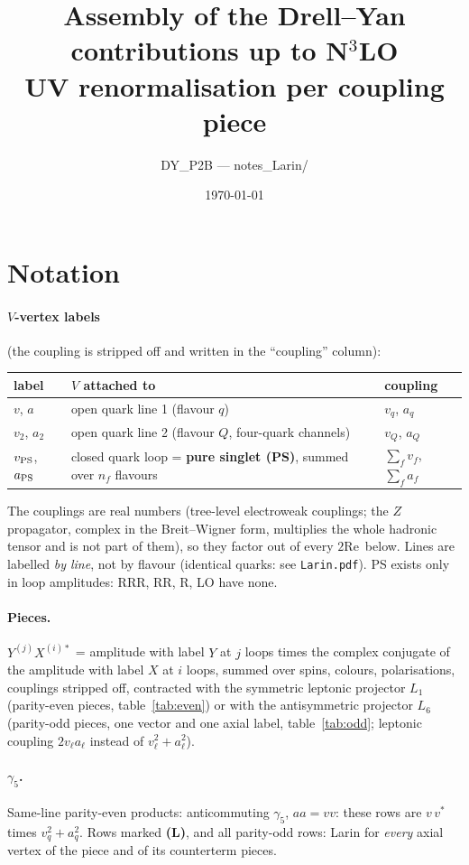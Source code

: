 \documentclass[11pt,a4paper]{article}
\title{Assembly of the Drell--Yan contributions up to N$^3$LO\\[2pt]\large UV renormalisation per coupling piece}
\author{DY\_P2B --- notes\_Larin/}
\date{\today}
\renewcommand{\Re}{\mathrm{Re}\,}
\newcommand{\PS}{_{\rm PS}}
\begin{document}
\maketitle

\section{Notation}

\paragraph{$V$-vertex labels} (the coupling is stripped off and written in the ``coupling'' column):
\begin{center}
\begin{tabular}{lll}
\toprule
label & $V$ attached to & coupling \\
\midrule
$v$, $a$ & open quark line 1 (flavour $q$) & $v_q$, $a_q$ \\
$v_2$, $a_2$ & open quark line 2 (flavour $Q$, four-quark channels) & $v_Q$, $a_Q$ \\
$v\PS$, $a\PS$ & closed quark loop = \textbf{pure singlet (PS)}, summed over $n_f$ flavours & $\sum_fv_f$, $\sum_fa_f$ \\
\bottomrule
\end{tabular}
\end{center}
The couplings are real numbers (tree-level electroweak couplings; the $Z$ propagator, complex in the
Breit--Wigner form, multiplies the whole hadronic tensor and is not part of them), so they factor out of every
$2\Re$ below. Lines are labelled \emph{by line}, not by flavour (identical quarks: see \texttt{Larin.pdf}). PS exists only in loop
amplitudes: RRR, RR, R, LO have none.

\paragraph{Pieces.} $Y^{(j)}X^{(i)*}$ = amplitude with label $Y$ at $j$ loops times the complex conjugate of the
amplitude with label $X$ at $i$ loops, summed over spins, colours, polarisations, couplings stripped off, contracted
with the symmetric leptonic projector $L_1$ (parity-even pieces, table~\ref{tab:even}) or with the antisymmetric
projector $L_6$ (parity-odd pieces, one vector and one axial label, table~\ref{tab:odd}; leptonic coupling
$2v_\ell a_\ell$ instead of $v_\ell^2+a_\ell^2$).

\paragraph{$\gamma_5$.} Same-line parity-even products: anticommuting $\gamma_5$, $aa=vv$: these rows are $v\,v^*$
times $v_q^2+a_q^2$. Rows marked \textbf{(L)}, and all parity-odd rows: Larin for \emph{every} axial vertex of the
piece and of its counterterm pieces.
\end{document}
